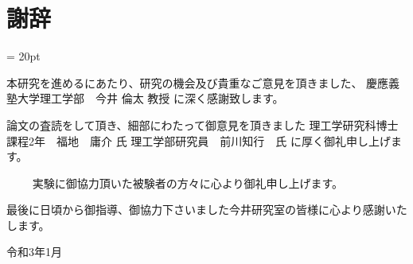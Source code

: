 %
%
\chapter*{謝辞}
\baselineskip = 20pt

\begin{verbatimtab}
	本研究を進めるにあたり、研究の機会及び貴重なご意見を頂きました、
			慶應義塾大学理工学部　今井 倫太 教授
に深く感謝致します。


	論文の査読をして頂き、細部にわたって御意見を頂きました
			理工学研究科博士課程2年　福地　庸介 氏
			理工学部研究員　前川知行　氏
に厚く御礼申し上げます。

　　
	実験に御協力頂いた被験者の方々に心より御礼申し上げます。



最後に日頃から御指導、御協力下さいました今井研究室の皆様に心より感謝いたします。


							令和3年1月
\end{verbatimtab}




% 　　






